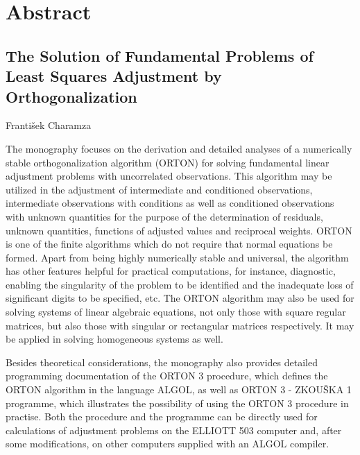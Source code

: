 
\chapter*{Abstract}
\section*{The Solution of Fundamental Problems of Least
          Squares Adjustment by Orthogonalization}

\begin{center}
František Charamza
\end{center}

\noindent
%
The monography focuses on the derivation and detailed
analyses of a numerically stable orthogonalization algorithm
(ORTON) for solving fundamental linear adjustment problems
with uncorrelated observations. This algorithm may be utilized
in the adjustment of intermediate and conditioned observations,
intermediate observations with conditions as well as
conditioned observations with unknown quantities for the purpose of
the determination of residuals, unknown quantities, functions
of adjusted values and reciprocal weights. ORTON is one of the
finite algorithms which do not require that normal equations
be formed. Apart from being highly numerically stable and
universal, the algorithm has other features helpful for practical
computations, for instance, diagnostic, enabling the
singularity of the problem to be identified and the inadequate loss of
significant digits to be specified, etc. The ORTON algorithm
may also be used for solving systems of linear algebraic
equations, not only those with square regular matrices, but also
those with singular or rectangular matrices respectively. It
may be applied in solving homogeneous systems as well.

Besides theoretical considerations, the monography also
provides detailed programming documentation of the ORTON 3
procedure, which defines the ORTON algorithm in the language ALGOL, as
well as ORTON 3 - ZKOUŠKA 1 programme, which illustrates the
possibility of using the ORTON 3 procedure in practise. Both
the procedure and the programme can be directly used for
calculations of adjustment problems on the ELLIOTT 503 computer and,
after some modifications, on other computers supplied with an
ALGOL compiler.
